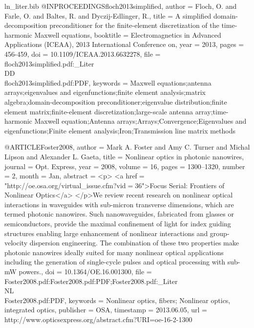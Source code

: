 \begin{filecontents*}{ln_liter.bib}
@INPROCEEDINGS{floch2013simplified,
  author = {Floch, O. and Farle, O. and Baltes, R. and Dyczij-Edlinger, R.},
  title = {A simplified domain-decomposition preconditioner for the finite-element
	discretization of the time-harmonic {M}axwell equations},
  booktitle = {Electromagnetics in Advanced Applications (ICEAA), 2013 International
	Conference on},
  year = {2013},
  pages = {456-459},
  doi = {10.1109/ICEAA.2013.6632278},
  file = {floch2013simplified.pdf:_Liter\\DD\\floch2013simplified.pdf:PDF},
  keywords = {{M}axwell equations;antenna arrays;eigenvalues and eigenfunctions;finite
	element analysis;matrix algebra;domain-decomposition preconditioner;eigenvalue
	distribution;finite element matrix;finite-element discretization;large-scale
	antenna array;time-harmonic {M}axwell equation;Antenna arrays;Arrays;Convergence;Eigenvalues
	and eigenfunctions;Finite element analysis;Iron;Transmission line
	matrix methods}
}

@ARTICLE{Foster2008,
  author = {Mark A. Foster and Amy C. Turner and Michal Lipson and Alexander
	L. Gaeta},
  title = {Nonlinear optics in photonic nanowires},
  journal = {Opt. Express},
  year = {2008},
  volume = {16},
  pages = {1300--1320},
  number = {2},
  month = {Jan},
  abstract = {{\textless}p{\textgreater} {\textless}a href$=$"http://oe.osa.org/virtual_issue.cfm?vid$=$36"{\textgreater}Focus
	Serial: Frontiers of Nonlinear Optics{\textless}/a{\textgreater}
	{\textless}/p{\textgreater}We review recent research on nonlinear
	optical interactions in waveguides with sub-micron transverse dimensions,
	which are termed photonic nanowires. Such nanowaveguides, fabricated
	from glasses or semiconductors, provide the maximal confinement of
	light for index guiding structures enabling large enhancement of
	nonlinear interactions and group-velocity dispersion engineering.
	The combination of these two properties make photonic nanowires ideally
	suited for many nonlinear optical applications including the generation
	of single-cycle pulses and optical processing with sub-mW powers.},
  doi = {10.1364/OE.16.001300},
  file = {Foster2008.pdf:Foster2008.pdf:PDF;Foster2008.pdf:_Liter\\NL\\Foster2008.pdf:PDF},
  keywords = {Nonlinear optics, fibers; Nonlinear optics, integrated optics},
  publisher = {OSA},
  timestamp = {2013.06.05},
  url = {http://www.opticsexpress.org/abstract.cfm?URI=oe-16-2-1300}
}


\end{filecontents*}
